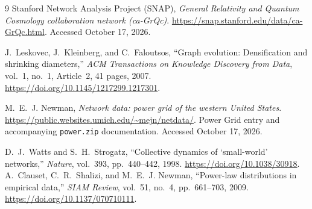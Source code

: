 \begin{thebibliography}{9}
Stanford Network Analysis Project (SNAP),
\emph{General Relativity and Quantum Cosmology collaboration network (ca-GrQc)}.
\url{https://snap.stanford.edu/data/ca-GrQc.html}.
Accessed October 17, 2026.

J.~Leskovec, J.~Kleinberg, and C.~Faloutsos,
``Graph evolution: Densification and shrinking diameters,''
\emph{ACM Transactions on Knowledge Discovery from Data}, vol.~1, no.~1,
Article~2, 41 pages, 2007.
\url{https://doi.org/10.1145/1217299.1217301}.

M.~E.~J. Newman,
\emph{Network data: power grid of the western United States}.
\url{https://public.websites.umich.edu/~mejn/netdata/}.
Power Grid entry and accompanying \texttt{power.zip} documentation.
Accessed October 17, 2026.

D.~J.~Watts and S.~H.~Strogatz,
``Collective dynamics of `small-world' networks,''
\emph{Nature}, vol.~393, pp.~440--442, 1998.
\url{https://doi.org/10.1038/30918}.
A.~Clauset, C.~R.~Shalizi, and M.~E.~J. Newman,
``Power-law distributions in empirical data,''
\emph{SIAM Review}, vol.~51, no.~4, pp.~661--703, 2009.
\url{https://doi.org/10.1137/070710111}.
\end{thebibliography}

